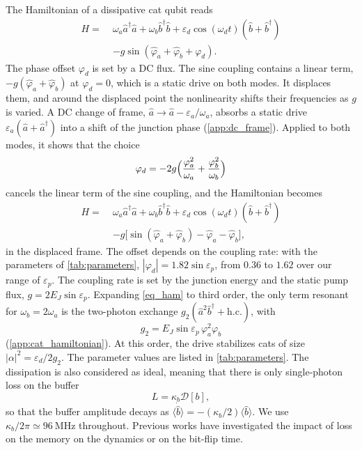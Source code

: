 \documentclass[aps,prx,reprint,floatfix,amsmath,amssymb,longbibliography]{revtex4-2}
\newcommand{\eps}{\varepsilon}
\newcommand{\da}{^\dagger}
\newcommand{\ha}{\hat{a}}
\newcommand{\hb}{\hat{b}}
\begin{document}
The Hamiltonian of a dissipative cat qubit reads \cite{Carde2025Feb}
\begin{equation}
\begin{split}
    H =\;& \omega_a\ha\da\ha+\omega_b\hb\da\hb+\eps_d\cos(\omega_d t)(\hb+\hb\da)\\
    &-g\sin(\hat\varphi_a+\hat\varphi_b+\varphi_d).
\end{split}
\label{eq_ham_0}
\end{equation}
The phase offset $\varphi_d$ is set by a DC flux. The sine coupling contains a linear term, $-g(\hat\varphi_a+\hat\varphi_b)$ at $\varphi_d=0$, which is a static drive on both modes. It displaces them, and around the displaced point the nonlinearity shifts their frequencies as $g$ is varied. A DC change of frame, $\ha\to\ha-\eps_a/\omega_a$, absorbs a static drive $\eps_a(\ha+\ha\da)$ into a shift of the junction phase (\cref{app:dc_frame}). Applied to both modes, it shows that the choice
\begin{equation}
    \varphi_d=-2g\Bigl(\frac{\varphi_a^2}{\omega_a}+\frac{\varphi_b^2}{\omega_b}\Bigr)
    \label{eq_phi_d}
\end{equation}
cancels the linear term of the sine coupling, and the Hamiltonian becomes
\begin{equation}
\begin{split}
    H =\;& \omega_a\ha\da\ha+\omega_b\hb\da\hb+\eps_d\cos(\omega_d t)(\hb+\hb\da)\\
    &-g\bigl[\sin(\hat\varphi_a+\hat\varphi_b)-\hat\varphi_a-\hat\varphi_b\bigr],
\end{split}
\label{eq_ham}
\end{equation}
in the displaced frame. The offset depends on the coupling rate: with the parameters of \cref{tab:parameters}, $|\varphi_d|=1.82\sin\eps_p$, from $0.36$ to $1.62$ over our range of $\eps_p$.
The coupling rate is set by the junction energy and the static pump flux, $g=2E_J\sin\eps_p$. Expanding \cref{eq_ham} to third order, the only term resonant for $\omega_b=2\omega_a$ is the two-photon exchange $g_2(\ha^2\hb\da+\text{h.c.})$, with
\begin{equation}
    g_2=E_J\sin\eps_p\,\varphi_a^2\varphi_b
    \label{eq_g2}
\end{equation}
(\cref{app:cat_hamiltonian}). At this order, the drive stabilizes cats of size $|\alpha|^2=\eps_d/2g_2$. The parameter values are listed in \cref{tab:parameters}.
The dissipation is also considered as ideal, meaning that there is only single-photon loss on the buffer
\begin{equation}
    L=\kappa_b\mathcal{D}[b],
\end{equation}
so that the buffer amplitude decays as $\langle\dot{\hat b}\rangle=-(\kappa_b/2)\langle\hat b\rangle$. We use $\kappa_b/2\pi\simeq96~\mathrm{MHz}$ throughout.
Previous works have investigated the impact of loss on the memory on the dynamics\cite{Carde2025Feb} or on the bit-flip time\cite{Dubovitskii2025Jan}.
\end{document}
